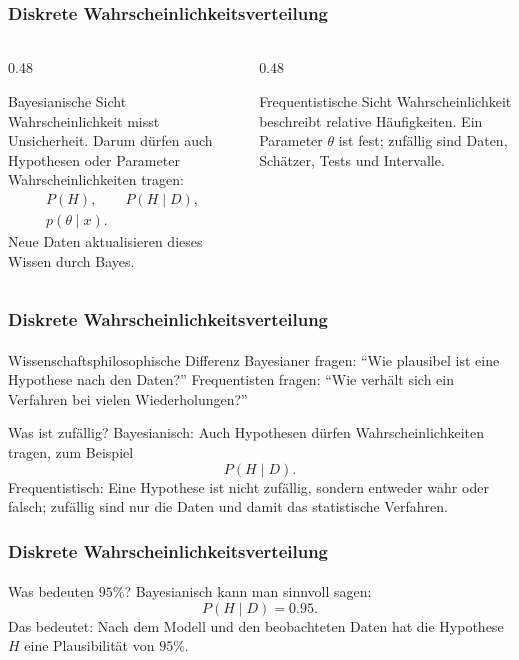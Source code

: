 \documentclass{beamer}
\begin{document}
\begin{frame}
    \frametitle{Diskrete Wahrscheinlichkeitsverteilung}
\framesubtitle{}

\begin{columns}[T]
\begin{column}{0.48\textwidth}
\begin{block}{Bayesianische Sicht}
Wahrscheinlichkeit misst Unsicherheit.
Darum dürfen auch Hypothesen oder Parameter Wahrscheinlichkeiten tragen:
\begin{align*}
P(H), \qquad P(H \mid D), \\
p(\theta \mid x).
\end{align*}
Neue Daten aktualisieren dieses Wissen durch Bayes.
\end{block}
\end{column}
\begin{column}{0.48\textwidth}
\begin{block}{Frequentistische Sicht}
Wahrscheinlichkeit beschreibt relative Häufigkeiten.
Ein Parameter \(\theta\) ist fest; zufällig sind Daten, Schätzer, Tests und Intervalle.
\end{block}
\end{column}
\end{columns}

 \end{frame}


\begin{frame}
    \frametitle{Diskrete Wahrscheinlichkeitsverteilung}
\framesubtitle{}

\begin{block}{Wissenschaftsphilosophische Differenz}
Bayesianer fragen: ``Wie plausibel ist eine Hypothese nach den Daten?''
Frequentisten fragen: ``Wie verhält sich ein Verfahren bei vielen Wiederholungen?''
\end{block}

\begin{block}{Was ist zufällig?}
Bayesianisch: Auch Hypothesen dürfen Wahrscheinlichkeiten tragen, zum Beispiel
\[
P(H \mid D).
\]
Frequentistisch: Eine Hypothese ist nicht zufällig, sondern entweder wahr oder falsch; zufällig sind nur die Daten und damit das statistische Verfahren.
\end{block}

 \end{frame}


\begin{frame}
    \frametitle{Diskrete Wahrscheinlichkeitsverteilung}
\framesubtitle{}

\begin{block}{Was bedeuten $95\%$?}
Bayesianisch kann man sinnvoll sagen:
\[
P(H \mid D)=0.95.
\]
Das bedeutet: Nach dem Modell und den beobachteten Daten hat die Hypothese \(H\) eine Plausibilität von $95\%$.
\end{block}

 \end{frame}
\end{document}
